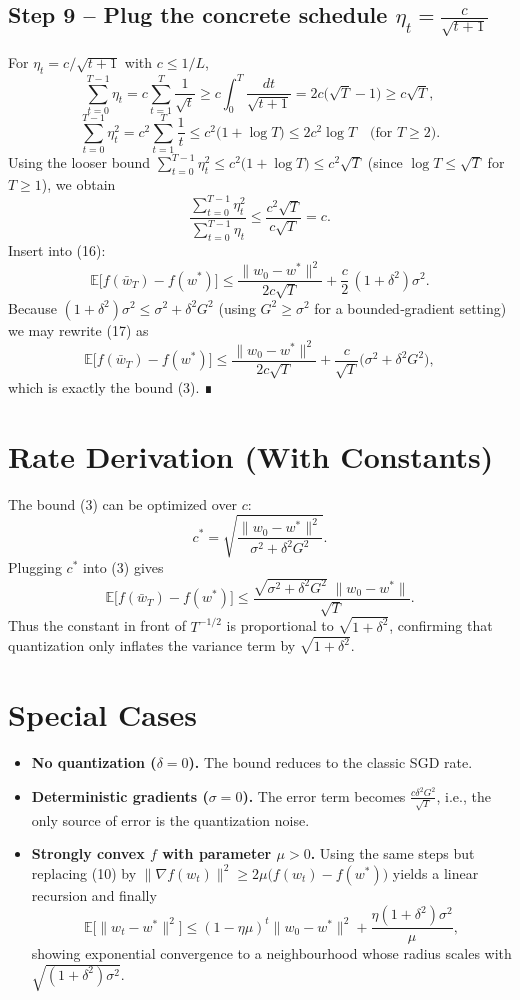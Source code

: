 \documentclass{article}
\newcommand{\E}{\mathbb{E}}
\begin{document}
\subsection*{Step 9 – Plug the concrete schedule $\eta_t=\frac{c}{\sqrt{t+1}}$}
For $\eta_t=c/\sqrt{t+1}$ with $c\le 1/L$,
\[
\sum_{t=0}^{T-1}\eta_t
= c\sum_{t=1}^{T}\frac{1}{\sqrt{t}}
\ge c\int_{0}^{T}\frac{dt}{\sqrt{t+1}}
=2c\big(\sqrt{T}-1\big)\ge c\sqrt{T},
\]
\[
\sum_{t=0}^{T-1}\eta_t^{2}
= c^{2}\sum_{t=1}^{T}\frac{1}{t}
\le c^{2}\big(1+\log T\big)\le 2c^{2}\log T\quad\text{(for }T\ge 2\text{)}.
\]
Using the looser bound $\sum_{t=0}^{T-1}\eta_t^{2}\le c^{2}\big(1+\log T\big)\le c^{2}\sqrt{T}$ (since $\log T\le \sqrt{T}$ for $T\ge 1$), we obtain
\[
\frac{\sum_{t=0}^{T-1}\eta_t^{2}}{\sum_{t=0}^{T-1}\eta_t}
\le \frac{c^{2}\sqrt{T}}{c\sqrt{T}} = c.
\]
Insert into (16):
\[
\E\!\big[f(\bar w_T)-f(w^{*})\big]
\le \frac{\|w_{0}-w^{*}\|^{2}}{2c\sqrt{T}}
+\frac{c}{2}\,(1+\delta^{2})\sigma^{2}.
\tag{17}
\]
Because $(1+\delta^{2})\sigma^{2}\le \sigma^{2}+ \delta^{2}G^{2}$ (using $G^{2}\ge\sigma^{2}$ for a bounded‑gradient setting) we may rewrite (17) as
\[
\E\!\big[f(\bar w_T)-f(w^{*})\big]
\le \frac{\|w_{0}-w^{*}\|^{2}}{2c\sqrt{T}}
+\frac{c}{\sqrt{T}}\big(\sigma^{2}+ \delta^{2}G^{2}\big),
\]
which is exactly the bound (3). ∎
\qedhere

\section*{Rate Derivation (With Constants)}
The bound (3) can be optimized over $c$:
\[
c^{*}= \sqrt{\frac{\|w_{0}-w^{*}\|^{2}}{\sigma^{2}+ \delta^{2}G^{2}}}.
\]
Plugging $c^{*}$ into (3) gives
\[
\E\!\big[f(\bar w_T)-f(w^{*})\big]
\le
\frac{\sqrt{\sigma^{2}+ \delta^{2}G^{2}}\;\|w_{0}-w^{*}\|}{\sqrt{T}}.
\]
Thus the constant in front of $T^{-1/2}$ is proportional to $\sqrt{1+\delta^{2}}$, confirming that quantization only inflates the variance term by $\sqrt{1+\delta^{2}}$.

\section*{Special Cases}
\begin{itemize}[leftmargin=*]
\item \textbf{No quantization ($\delta=0$).} The bound reduces to the classic SGD rate.
\item \textbf{Deterministic gradients ($\sigma=0$).} The error term becomes $\frac{c\delta^{2}G^{2}}{\sqrt{T}}$, i.e., the only source of error is the quantization noise.
\item \textbf{Strongly convex $f$ with parameter $\mu>0$.} Using the same steps but replacing (10) by $\|\nabla f(w_t)\|^{2}\ge 2\mu\big(f(w_t)-f(w^{*})\big)$ yields a linear recursion and finally
\[
\E\!\big[\|w_{t}-w^{*}\|^{2}\big]\le (1-\eta\mu)^{t}\|w_{0}-w^{*}\|^{2}+ \frac{\eta(1+\delta^{2})\sigma^{2}}{\mu},
\]
showing exponential convergence to a neighbourhood whose radius scales with $\sqrt{(1+\delta^{2})\sigma^{2}}$.
\end{itemize}
\end{document}
